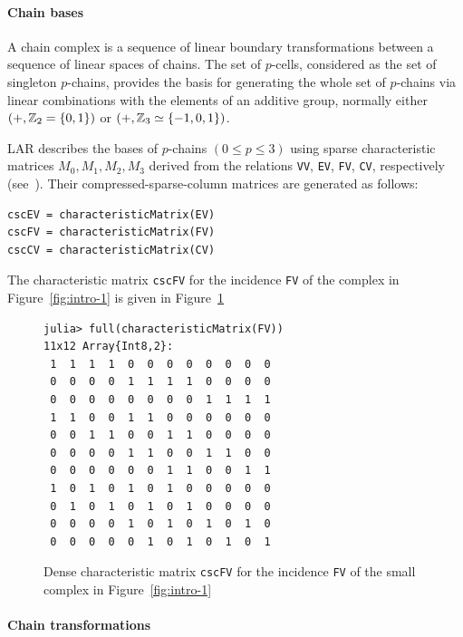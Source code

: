 \paragraph{Chain bases}

A chain complex is a sequence of linear boundary transformations between a sequence of linear spaces of chains. The set of $p$-cells, considered as the set of singleton $p$-chains, provides the basis for generating the whole set of $p$-chains via linear combinations with the elements of an additive group, normally either $(+,\mathbb{Z}_2=\{0,1\})$ or $(+,\mathbb{Z}_3\simeq\{-1,0,1\})$.

LAR describes the bases of $p$-chains $(0\leq p\leq 3)$ using sparse characteristic matrices  $M_0, M_1, M_2, M_3$ derived from the relations \texttt{VV}, \texttt{EV}, \texttt{FV}, \texttt{CV}, respectively  (see~\cite{Dicarlo:2014:TNL:2543138.2543294}).
Their compressed-sparse-column matrices are generated as follows:
{\small\begin{verbatim}
cscEV = characteristicMatrix(EV)
cscFV = characteristicMatrix(FV)
cscCV = characteristicMatrix(CV)
\end{verbatim}}

The characteristic matrix \texttt{cscFV} for the incidence \texttt{FV} of the complex in Figure~\ref{fig:intro-1} is given in Figure~\ref{fig:intro-0}

\begin{figure}[htbp] %
\begin{center}
\begin{minipage}[c]{0.5\textwidth}
\small\begin{verbatim}
julia> full(characteristicMatrix(FV))
11x12 Array{Int8,2}:
 1  1  1  1  0  0  0  0  0  0  0  0
 0  0  0  0  1  1  1  1  0  0  0  0
 0  0  0  0  0  0  0  0  1  1  1  1
 1  1  0  0  1  1  0  0  0  0  0  0
 0  0  1  1  0  0  1  1  0  0  0  0
 0  0  0  0  1  1  0  0  1  1  0  0
 0  0  0  0  0  0  1  1  0  0  1  1
 1  0  1  0  1  0  1  0  0  0  0  0
 0  1  0  1  0  1  0  1  0  0  0  0
 0  0  0  0  1  0  1  0  1  0  1  0
 0  0  0  0  0  1  0  1  0  1  0  1
\end{verbatim}
\end{minipage}
\end{center}
   \caption{Dense characteristic matrix \texttt{cscFV} for the incidence \texttt{FV} of the small complex in Figure~\ref{fig:intro-1}}
   \label{fig:intro-0}
\end{figure}

\paragraph{Chain transformations}


